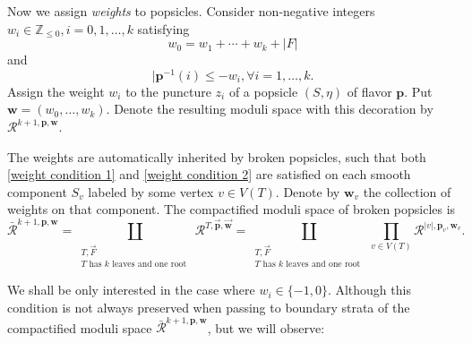 \documentclass[11pt]{amsproc}
\def\Z{{\mathbb Z}}
\def\cR{\mathcal{R}}
\theoremstyle{remark}
\numberwithin{equation}{section}
\begin{document}
Now we assign {\it weights} to popsicles. 
Consider non-negative integers $w_{i} \in \Z_{\le 0}, i = 0, 1,\ldots, k$ satisfying
\begin{equation}\label{weight condition 1}
w_{0} = w_{1} + \cdots + w_{k} + |F|
\end{equation}
and
\begin{equation}\label{weight condition 2}
|\mathbf{p}^{-1}(i) \le -w_{i}, \forall i=1,\ldots, k.
\end{equation}
Assign the weight $w_{i}$ to the puncture $z_{i}$ of a popsicle $(S, \eta)$ of flavor $\mathbf{p}$.
Put $\mathbf{w} = (w_{0}, \ldots, w_{k})$. 
Denote the resulting moduli space with this decoration by $\cR^{k+1, \mathbf{p}, \mathbf{w}}$.

The weights are automatically inherited by broken popsicles,
such that both \eqref{weight condition 1} and \eqref{weight condition 2} are satisfied on each smooth component $S_{v}$ labeled by some vertex $v \in V(T)$.
Denote by $\mathbf{w}_{v}$ the collection of weights on that component.
The compactified moduli space of broken popsicles is
\begin{equation}\label{compactified moduli space of popsicles}
\bar{\cR}^{k+1, \mathbf{p}, \mathbf{w}} = \coprod_{\substack{T, \vec{F}\\ T \text{ has } k \text{ leaves and one root }}} \cR^{T, \vec{\mathbf{p}}, \vec{\mathbf{w}}}
= \coprod_{\substack{T, \vec{F}\\ T \text{ has } k \text{ leaves and one root }}} \prod_{v \in V(T)} \mathcal{R}^{|v|, \mathbf{p}_{v}, \mathbf{w}_{v}}.
\end{equation}

We shall be only interested in the case where $w_{i} \in \{-1, 0\}$.
Although this condition is not always preserved when passing to boundary strata of the compactified moduli space $\bar{\cR}^{k+1, \mathbf{p}, \mathbf{w}}$,
but we will observe:
\end{document}
